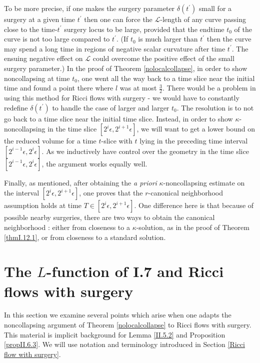 \documentclass[12pt]{amsart}
\renewcommand{\L}{{\mathcal L}}
\newcommand{\de}{\delta}
\newcommand{\eps}{\epsilon}
\numberwithin{equation}{section}
\theoremstyle{plain}
\theoremstyle{definition}
\theoremstyle{remark}
\begin{document}
To be more precise, if one makes the surgery parameter $\de(t^\prime)$ small
for a surgery at a given time $t^\prime$ then one can force the $\L$-length of
any curve passing close to the time-$t^\prime$ surgery locus to be large, provided that the
endtime $t_0$ of the curve is not too large compared to $t^\prime$. 
(If $t_0$ is much larger than $t^\prime$ then the curve may spend a long time
in regions of negative scalar curvature after time $t^\prime$. The ensuing negative 
effect on $\L$ could overcome the
positive effect of the small surgery parameter.)  
In the proof of Theorem
\ref{nolocalcollapse}, in order to show noncollapsing at time $t_0$, one went all 
the way back to a time slice near the initial time and found a point there where
$l$ was at most $\frac32$. There would be a problem in using this method
for Ricci flows with surgery - we would have to constantly redefine $\delta(t^\prime)$
to handle the case of larger and larger $t_0$. The resolution is to not go back to
a time slice
near the initial time slice. Instead, in order to
show $\kappa$-noncollapsing in the time slice
$[2^i \eps, 2^{i+1} \eps]$, we will want to get a lower bound on the
reduced volume for
a time $t$-slice with $t$ lying in the preceding time interval
$[2^{i-1}\eps,2^i\eps]$.   As we inductively have control over the geometry
in the time slice $[2^{i-1}\eps,2^i\eps]$, the argument works equally well.

Finally, as mentioned, after obtaining the {\it a priori} $\kappa$-noncollapsing
estimate on the interval $[2^{i}\eps,2^{i+1}\eps]$, one proves that the
$r$-canonical neighborhood assumption holds at time
$T \in [2^{i}\eps,2^{i+1}\eps]$. One difference here is
that because of possible nearby surgeries, there are two ways
to obtain the canonical neighborhood : either from closeness to
a $\kappa$-solution, as in the proof of
Theorem \ref{thmI.12.1}, or from closeness to a standard
solution.



\section{The $L$-function  of I.7 and Ricci flows with surgery}
\label{lfunctionandsurgerysection}


In this section we examine several points which arise when one adapts
the noncollapsing argument of Theorem \ref{nolocalcollapse} to Ricci flows with surgery.
This material is implicit background for 
Lemma \ref{II.5.2} and Proposition \ref{propII.6.3}.  We will use notation 
and terminology introduced in Section \ref{Ricci flow with surgery}.
\end{document}
